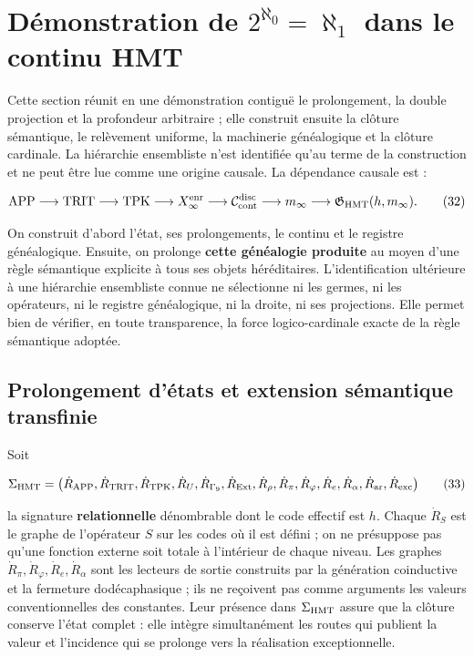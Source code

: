 \section{Démonstration de \texorpdfstring{\(2^{\aleph_0}=\aleph_1\)}{2 élevé à aleph zéro égal à aleph un} dans le continu HMT}
\label{ix:sec:cierre-cardinal-nativo}

Cette section réunit en une démonstration contiguë le prolongement, la double projection et la profondeur arbitraire ; elle construit ensuite la clôture sémantique, le relèvement uniforme, la machinerie généalogique et la clôture cardinale. La hiérarchie ensembliste n'est identifiée qu'au terme de la construction et ne peut être lue comme une origine causale. La dépendance causale est :

\[
 \mathrm{APP}\longrightarrow\mathrm{TRIT}\longrightarrow\mathrm{TPK}
 \longrightarrow X_\infty^{\rm enr}
 \longrightarrow\mathcal C_{\rm cont}^{\rm disc}
 \longrightarrow m_\infty
 \longrightarrow\mathfrak G_{\rm HMT}(h,m_\infty).
\tag{32}\label{ix:eq:ch-cadena-causal}
\]

On construit d’abord l’état, ses prolongements, le continu et le registre généalogique.
Ensuite, on prolonge \textbf{cette généalogie produite} au moyen d’une règle sémantique
explicite à tous ses objets héréditaires. L’identification ultérieure à
une hiérarchie ensembliste connue ne sélectionne ni les germes, ni les opérateurs,
ni le registre généalogique, ni la droite, ni ses projections. Elle permet bien de vérifier, en toute
transparence, la force logico-cardinale exacte de la règle sémantique adoptée.

\subsection{Prolongement d’états et extension sémantique transfinie}

Soit

\[
 \Sigma_{\rm HMT}
 =\bigl(\dot R_{\rm APP},\dot R_{\rm TRIT},\dot R_{\rm TPK},
 \dot R_{U},\dot R_{\Gamma_9},\dot R_{\rm Ext},\dot R_\rho,
 \dot R_{\pi},\dot R_{\varphi},\dot R_e,\dot R_{\alpha},
 \dot R_{\rm ar},\dot R_{\rm exc}\bigr)
\tag{33}\label{ix:eq:ch-signatura}
\]

la signature \textbf{relationnelle} dénombrable dont le code effectif est \(h\). Chaque
\(\dot R_S\) est le graphe de l’opérateur \(S\) sur les codes où il est
défini ; on ne présuppose pas qu’une fonction externe soit totale à l’intérieur de chaque
niveau. Les graphes \(\dot R_{\pi},\dot R_{\varphi},\dot R_e,\dot R_{\alpha}\)
sont les lecteurs de sortie construits par la génération coinductive et la
fermeture dodécaphasique ; ils ne reçoivent pas comme arguments les valeurs conventionnelles des
constantes. Leur présence dans \(\Sigma_{\rm HMT}\) assure que la clôture
conserve l’état complet : elle intègre simultanément les routes qui publient la
valeur et l’incidence qui se prolonge vers la réalisation exceptionnelle.

